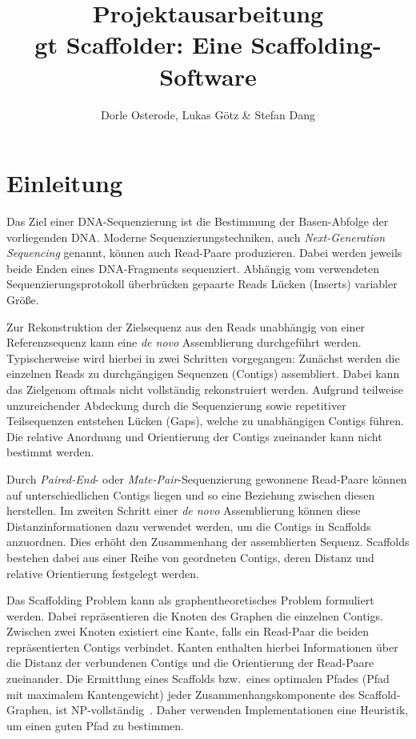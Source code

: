 \documentclass[a4paper,11pt,parskip]{scrartcl}
\title{Projektausarbeitung \\\vspace{.5cm} \large gt Scaffolder: Eine Scaffolding-Software}
\author{Dorle Osterode, Lukas Götz \& Stefan Dang}
\date{}
\begin{document}
\maketitle{}
\thispagestyle{empty}
\begin{abstract}
\end{abstract}

\newpage{}
\thispagestyle{empty}
\tableofcontents{}
\newpage{}
\setcounter{page}{1}
\section{Einleitung}

Das Ziel einer DNA-Sequenzierung ist die Bestimmung der Basen-Abfolge
der vorliegenden DNA. Moderne Sequenzierungstechniken, auch
\textit{Next-Generation Sequencing} genannt, können auch Read-Paare
produzieren. Dabei werden jeweils beide Enden eines DNA-Fragments
sequenziert. Abhängig vom verwendeten Sequenzierungsprotokoll
überbrücken gepaarte Reads Lücken (Inserts) variabler Größe.

Zur Rekonstruktion der Zielsequenz aus den Reads unabhängig von einer
Referenzsequenz kann eine \textit{de novo} Assemblierung durchgeführt
werden. Typischerweise wird hierbei in zwei Schritten vorgegangen:
Zunächst werden die einzelnen Reads zu durchgängigen Sequenzen
(Contigs) assembliert. Dabei kann das Zielgenom oftmals nicht
vollständig rekonstruiert werden. Aufgrund teilweise unzureichender
Abdeckung durch die Sequenzierung sowie repetitiver Teilsequenzen
entstehen Lücken (Gaps), welche zu unabhängigen Contigs führen. Die
relative Anordnung und Orientierung der Contigs zueinander kann nicht
bestimmt werden.

Durch \textit{Paired-End}- oder \textit{Mate-Pair}-Sequenzierung
gewonnene Read-Paare können auf unterschiedlichen Contigs liegen und
so eine Beziehung zwischen diesen herstellen. Im zweiten Schritt einer
\textit{de novo} Assemblierung können diese Distanzinformationen dazu
verwendet werden, um die Contigs in Scaffolds anzuordnen. Dies erhöht
den Zusammenhang der assemblierten Sequenz. Scaffolds bestehen
dabei aus einer Reihe von geordneten Contigs, deren Distanz und
relative Orientierung festgelegt werden.

Das Scaffolding Problem kann als graphentheoretisches Problem
formuliert werden. Dabei repräsentieren die Knoten des Graphen die
einzelnen Contigs. Zwischen zwei Knoten existiert eine Kante, falls
ein Read-Paar die beiden repräsentierten Contigs verbindet. Kanten
enthalten hierbei Informationen über die Distanz der verbundenen
Contigs und die Orientierung der Read-Paare zueinander. Die Ermittlung
eines Scaffolds bzw.\ eines optimalen Pfades (Pfad mit maximalem
Kantengewicht) jeder Zusammenhangskomponente des Scaffold-Graphen, ist
NP-vollständig~\cite{Huson:2002kf}. Daher verwenden Implementationen
eine Heuristik, um einen guten Pfad zu bestimmen.
\end{document}
